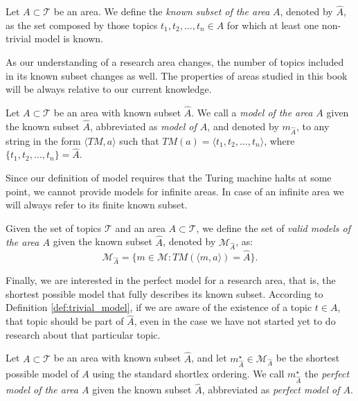 \begin{definition}
Let $A \subset \mathcal{T}$ be an area. We define the \emph{known subset of the area} $A$, denoted by $\hat{A}$, as the set composed by those topics $t_1, t_2, \ldots, t_n \in A$ for which at least one non-trivial model is known.
\end{definition}

As our understanding of a research area changes, the number of topics included in its known subset changes as well. The properties of areas studied in this book will be always relative to our current knowledge.

\begin{definition}
Let $A \subset \mathcal{T}$ be an area with known subset $\hat{A}$. We call a \emph{model of the area $A$} given the known subset $\hat{A}$, abbreviated as \emph{model of $A$}, and denoted by $m_{\hat{A}}$, to any string in the form $\langle TM, a\rangle$ such that $TM(a) = \langle t_1, t_2, \ldots, t_n\rangle$, where $\{t_1, t_2, \ldots, t_n\} = \hat{A}$.
\end{definition}

Since our definition of model requires that the Turing machine halts at some point, we cannot provide models for infinite areas. In case of an infinite area we will always refer to its finite known subset.

\begin{definition}
Given the set of topics $\mathcal{T}$ and an area $A \subset \mathcal{T}$, we define the set of \emph{valid models of the area $A$} given the known subset $\hat{A}$, denoted by $\mathcal{M}_{\hat{A}}$, as:
\[
\mathcal{M}_{\hat{A}} = \{ m \in \mathcal{M} : TM \left(\langle m, a \rangle \right) = \hat{A} \}.
\]
\end{definition}

Finally, we are interested in the perfect model for a research area, that is, the shortest possible model that fully describes its known subset. According to Definition \ref{def:trivial_model}, if we are aware of the existence of a topic $t \in A$, that topic should be part of $\hat{A}$, even in the case we have not started yet to do research about that particular topic.

\begin{definition}
Let $A \subset \mathcal{T}$ be an area with known subset $\hat{A}$, and let $m_{\hat{A}}^{\star} \in \mathcal{M}_{\hat{A}}$ be the shortest possible model of $A$ using the standard shortlex ordering. We call  $m_{\hat{A}}^{\star}$ the \emph{perfect model of the area $A$} given the known subset $\hat{A}$, abbreviated as \emph{perfect model of $A$}.
\end{definition}

